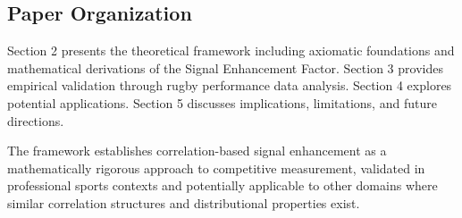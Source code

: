 \subsection{Paper Organization}

Section 2 presents the theoretical framework including axiomatic foundations and mathematical derivations of the Signal Enhancement Factor. Section 3 provides empirical validation through rugby performance data analysis. Section 4 explores potential applications. Section 5 discusses implications, limitations, and future directions.

The framework establishes correlation-based signal enhancement as a mathematically rigorous approach to competitive measurement, validated in professional sports contexts and potentially applicable to other domains where similar correlation structures and distributional properties exist.
